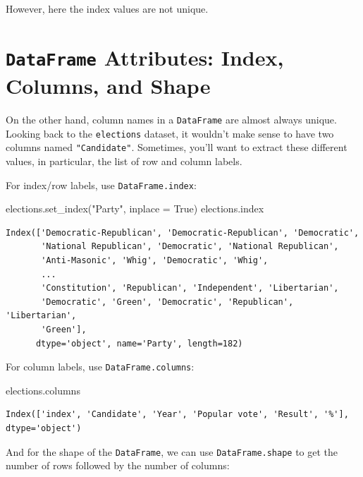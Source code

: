 \documentclass[
  letterpaper,
  DIV=11,
  numbers=noendperiod]{scrreprt}
\newenvironment{Shaded}{\begin{snugshade}}{\end{snugshade}}
\newcommand{\NormalTok}[1]{\textcolor[rgb]{0.00,0.23,0.31}{#1}}
\newcommand{\OperatorTok}[1]{\textcolor[rgb]{0.37,0.37,0.37}{#1}}
\newcommand{\StringTok}[1]{\textcolor[rgb]{0.13,0.47,0.30}{#1}}
\newcommand{\VariableTok}[1]{\textcolor[rgb]{0.07,0.07,0.07}{#1}}
\begin{document}
However, here the index values are not unique.

\section{\texorpdfstring{\texttt{DataFrame} Attributes: Index, Columns,
and
Shape}{DataFrame Attributes: Index, Columns, and Shape}}\label{dataframe-attributes-index-columns-and-shape}

On the other hand, column names in a \texttt{DataFrame} are almost
always unique. Looking back to the \texttt{elections} dataset, it
wouldn't make sense to have two columns named \texttt{"Candidate"}.
Sometimes, you'll want to extract these different values, in particular,
the list of row and column labels.

For index/row labels, use \texttt{DataFrame.index}:

\begin{Shaded}
\begin{Highlighting}[]
\NormalTok{elections.set\_index(}\StringTok{"Party"}\NormalTok{, inplace }\OperatorTok{=} \VariableTok{True}\NormalTok{)}
\NormalTok{elections.index}
\end{Highlighting}
\end{Shaded}

\begin{verbatim}
Index(['Democratic-Republican', 'Democratic-Republican', 'Democratic',
       'National Republican', 'Democratic', 'National Republican',
       'Anti-Masonic', 'Whig', 'Democratic', 'Whig',
       ...
       'Constitution', 'Republican', 'Independent', 'Libertarian',
       'Democratic', 'Green', 'Democratic', 'Republican', 'Libertarian',
       'Green'],
      dtype='object', name='Party', length=182)
\end{verbatim}

For column labels, use \texttt{DataFrame.columns}:

\begin{Shaded}
\begin{Highlighting}[]
\NormalTok{elections.columns}
\end{Highlighting}
\end{Shaded}

\begin{verbatim}
Index(['index', 'Candidate', 'Year', 'Popular vote', 'Result', '%'], dtype='object')
\end{verbatim}

And for the shape of the \texttt{DataFrame}, we can use
\texttt{DataFrame.shape} to get the number of rows followed by the
number of columns:
\end{document}
